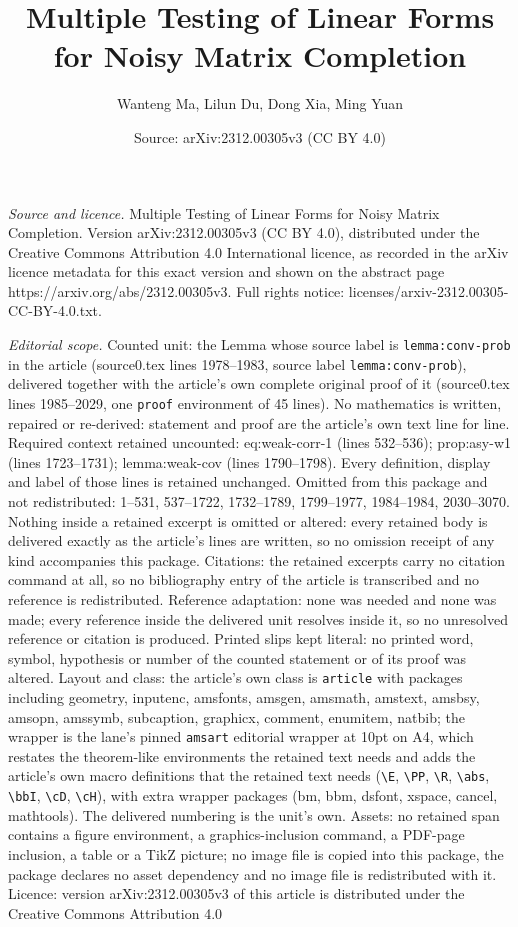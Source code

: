 \documentclass[10pt,a4paper]{amsart}
\title[Multiple Testing of Linear Forms for Noisy Matrix Completion]{Multiple Testing of Linear Forms for Noisy Matrix Completion}
\author{Wanteng Ma, Lilun Du, Dong Xia, Ming Yuan}
\date{Source: arXiv:2312.00305v3 (CC BY 4.0)}
\begin{document}
\maketitle

\noindent\emph{Source and licence.} Multiple Testing of Linear Forms for Noisy Matrix Completion. Version arXiv:2312.00305v3 (CC BY 4.0), distributed under the Creative Commons Attribution 4.0 International licence, as recorded in the arXiv licence metadata for this exact version and shown on the abstract page https://arxiv.org/abs/2312.00305v3. Full rights notice: licenses/arxiv-2312.00305-CC-BY-4.0.txt.\par\smallskip

\noindent\textit{Editorial scope.} Counted unit: the Lemma whose source label is \texttt{lemma:conv-prob} in the article (source0.tex lines 1978--1983, source label \texttt{lemma:conv-prob}), delivered together with the article's own complete original proof of it (source0.tex lines 1985--2029, one \texttt{proof} environment of 45 lines). No mathematics is written, repaired or re-derived: statement and proof are the article's own text line for line. Required context retained uncounted: eq:weak-corr-1 (lines 532--536); prop:asy-w1 (lines 1723--1731); lemma:weak-cov (lines 1790--1798). Every definition, display and label of those lines is retained unchanged. Omitted from this package and not redistributed: 1--531, 537--1722, 1732--1789, 1799--1977, 1984--1984, 2030--3070. Nothing inside a retained excerpt is omitted or altered: every retained body is delivered exactly as the article's lines are written, so no omission receipt of any kind accompanies this package. Citations: the retained excerpts carry no citation command at all, so no bibliography entry of the article is transcribed and no reference is redistributed. Reference adaptation: none was needed and none was made; every reference inside the delivered unit resolves inside it, so no unresolved reference or citation is produced. Printed slips kept literal: no printed word, symbol, hypothesis or number of the counted statement or of its proof was altered. Layout and class: the article's own class is \texttt{article} with packages including geometry, inputenc, amsfonts, amsgen, amsmath, amstext, amsbsy, amsopn, amssymb, subcaption, graphicx, comment, enumitem, natbib; the wrapper is the lane's pinned \texttt{amsart} editorial wrapper at 10pt on A4, which restates the theorem-like environments the retained text needs and adds the article's own macro definitions that the retained text needs (\texttt{\textbackslash E}, \texttt{\textbackslash PP}, \texttt{\textbackslash R}, \texttt{\textbackslash abs}, \texttt{\textbackslash bbI}, \texttt{\textbackslash cD}, \texttt{\textbackslash cH}), with extra wrapper packages (bm, bbm, dsfont, xspace, cancel, mathtools). The delivered numbering is the unit's own. Assets: no retained span contains a figure environment, a graphics-inclusion command, a PDF-page inclusion, a table or a TikZ picture; no image file is copied into this package, the package declares no asset dependency and no image file is redistributed with it. Licence: version arXiv:2312.00305v3 of this article is distributed under the Creative Commons Attribution 4.0 
\end{document}
